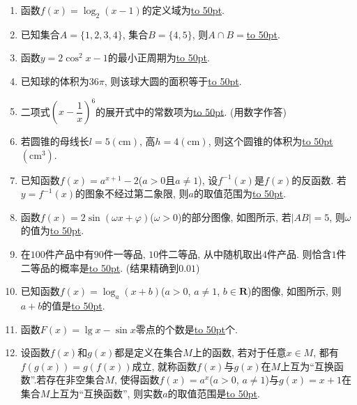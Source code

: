 \documentclass[10pt,a4paper]{article}
\newcommand{\blank}[1]{\underline{\hbox to #1pt{}}}
\begin{document}
\begin{enumerate}[1.]
\item 函数$f(x)=\log_2(x-1)$的定义域为\blank{50}.
\item 已知集合$A=\{1,2,3,4\}$, 集合$B=\{4,5\}$, 则$A\cap B=$\blank{50}.
\item 函数$y=2\cos ^2x-1$的最小正周期为\blank{50}. 	
\item 已知球的体积为$36\pi$, 则该球大圆的面积等于\blank{50}.
\item 二项式$(x-\dfrac 1x)^6$的展开式中的常数项为\blank{50}. (用数字作答)
\item 若圆锥的母线长$l=5(\text{cm})$, 高$h=4(\text{cm})$, 则这个圆锥的体积为\blank{50}$(\text{cm}^3)$.
\item 已知函数$f(x)=a^{x+1}-2$($a>0$且$a\ne 1$), 设$f^{-1}(x)$是$f(x)$的反函数. 若$y=f^{-1}(x)$的图象不经过第二象限, 则$a$的取值范围为\blank{50}.
\item 函数$f(x)=2\sin (\omega x+\varphi)$($\omega >0$)的部分图像, 如图所示, 若$|AB|=5$, 则$\omega$的值为\blank{50}.
\begin{center}
\end{center}
\item 在$100$件产品中有$90$件一等品, $10$件二等品, 从中随机取出$4$件产品.
则恰含$1$件二等品的概率是\blank{50}. (结果精确到$0.01$)
\item 已知函数$f(x)=\log_a(x+b)$($a>0$, $a\ne 1$, $b\in \mathbf{R}$)的图像, 如图所示, 则$a+b$的值是\blank{50}.
\begin{center}
\end{center}
\item 函数$F(x)=\lg x-\sin x$零点的个数是\blank{50}个.
\item 设函数$f(x)$和$g(x)$都是定义在集合$M$上的函数, 若对于任意$x\in M$, 都有$f(g(x))=g(f(x))$成立, 就称函数$f(x)$与$g(x)$在$M$上互为``互换函数''.若存在非空集合$M$, 使得函数$f(x)=a^x$($a>0$, $a\ne 1$)与$g(x)=x+1$在集合$M$上互为``互换函数'', 则实数$a$的取值范围是\blank{50}.

\end{enumerate}
\end{document}
